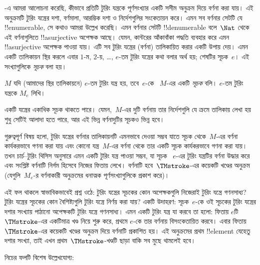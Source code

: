 \documentclass[../../../include/open-logic-section]{subfiles}
\begin{document}

-এ আমরা আলোচনা করেছি, কীভাবে প্রতিটি টুরিং যন্ত্রকে
পূর্ণসংখ্যার একটি সসীম অনুক্রম দিয়ে বর্ণনা করা যায়। এই অনুক্রমটি টুরিং
যন্ত্রের দশা, বর্ণমালা, আরম্ভিক দশা ও নির্দেশগুলির সংকেতায়ন করে। এমন সব
বর্ণনার সেটটি যে !!{enumerable}, সে কথাও আমরা উল্লেখ করেছি। এমন বর্ণনার
সেটটি !!{denumerable} বলে~$\Nat$ থেকে এই বর্ণনাগুলিতে !!a{surjective}
অপেক্ষক আছে। যেমন, কান্টরের আঁকাবাঁকা পদ্ধতি ব্যবহার করে এমন
!!a{surjective} অপেক্ষক পাওয়া যায়। এটি সব টুরিং যন্ত্রের (বর্ণনা)
তালিকায়িত করার একটি উপায় দেয়। এমন একটি তালিকায়ন স্থির করলে এবার
$1$-ম, $2$-য়, \dots, $e$-তম টুরিং যন্ত্রের কথা বলার অর্থ হয়; শেষটির
সূচক~$e$। এই সংখ্যাগুলিকে \emph{সূচক} বলা হয়।

\begin{defn}
$M$ যদি (আমাদের স্থির তালিকায়নে) $e$-তম টুরিং যন্ত্র হয়, তবে~$e$-কে
~$M$-এর একটি \emph{সূচক} বলি। $e$-তম টুরিং যন্ত্রকে $M_e$ লিখি।
\end{defn}

একটি যন্ত্রের একাধিক সূচক থাকতে পারে। যেমন,~$M$-এর দুটি বর্ণনায় তার
নির্দেশগুলি যে ক্রমে তালিকায় লেখা হয় শুধু সেটিই আলাদা হতে পারে, আর এই
ভিন্ন বর্ণনাদুটির সূচকও ভিন্ন হবে।

গুরুত্বপূর্ণ বিষয় হলো, টুরিং যন্ত্রের বর্ণনার তালিকায়নটি এমনভাবে দেওয়া
সম্ভব যাতে সূচক থেকে~$M$-এর বর্ণনা কার্যকরভাবে গণনা করা যায় এবং কোনো
যন্ত্র~$M$-এর বর্ণনা থেকে তার একটি সূচক কার্যকরভাবে গণনা করা যায়। তখন
চার্চ--টুরিং থিসিস অনুসারে এমন একটি টুরিং যন্ত্র পাওয়া সম্ভব, যা সূচক
~$e$-এর টুরিং যন্ত্রটির বর্ণনা উদ্ধার করে এবং সংশ্লিষ্ট বর্ণনাটি নির্গম
হিসেবে নিজের ফিতায় লেখে। বর্ণনাটি হবে~$\TMstroke$-এর কয়েকটি খণ্ডের
অনুক্রম (যেগুলি~$M_e$-র বর্ণনাকারী অনুক্রমের ধনাত্মক পূর্ণসংখ্যাগুলিকে
প্রকাশ করে)।

এই ফল থাকলে স্বাভাবিকভাবেই প্রশ্ন ওঠে: টুরিং যন্ত্রের সূচকের কোন
অপেক্ষকগুলি নিজেরাই টুরিং যন্ত্রে গণনসাধ্য? টুরিং যন্ত্রের সূচকের কোন
বৈশিষ্ট্যগুলি টুরিং যন্ত্রে নির্ণয় করা যায়? একটি উদাহরণ: সূচক~$e$-কে ওই
সূচকের টুরিং যন্ত্রের দশার সংখ্যায় পাঠানো অপেক্ষকটি টুরিং যন্ত্রে
গণনসাধ্য। এমন একটি টুরিং যন্ত্র যা করবে তা হলো: ফিতায় $e$টি
~$\TMstroke$-এর একটিমাত্র খণ্ড নিয়ে শুরু করে, প্রথমে $e$-কে তার বর্ণনায়
বিসংকেতায়িত করবে। এবার ফিতায়~$\TMstroke$-এর কয়েকটি খণ্ডের অনুক্রম দিয়ে
বর্ণনাটি প্রকাশিত হয়। এই অনুক্রমের প্রথম !!{element} যেহেতু দশার সংখ্যা,
তাই এখন প্রথম~$\TMstroke$-খণ্ডটি ছাড়া বাকি সব মুছে থামলেই হবে।

নিচের ফলটি বিশেষ উল্লেখযোগ্য:
\end{document}
